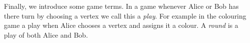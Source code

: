 Finally, we introduce some game terms. In a game whenever Alice or Bob has there turn by choosing a vertex we call this a \textit{play}. For example in the colouring game a play when Alice chooses a vertex and assigns it a colour. A \textit{round} is a play of both Alice and Bob.  %


    
    
    
    
    
    
    
    
    
    
    
    
    
    
    
    
    
    
    
    